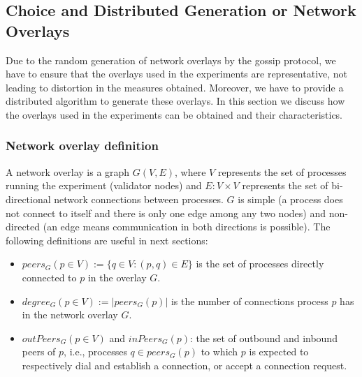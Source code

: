 














\subsection{Choice and Distributed Generation or Network Overlays}
\label{sec:topos}

Due to the random generation of network overlays by the gossip protocol, 
we have to ensure that the overlays used in the experiments are representative, not leading to distortion in the measures obtained.
Moreover, we have to provide a distributed algorithm to generate these overlays. In this section we discuss how the overlays used in the experiments can be obtained and their characteristics.

\subsubsection{Network overlay definition}

A network overlay is a graph $G(V,E)$, where $V$ represents the set of
processes running the experiment (validator nodes) and $E: V \times V$ represents the set of bi-directional network connections between processes.  $G$ is simple (a process does not connect to itself and there is only one edge among any two nodes) and non-directed
(an edge means communication in both directions is possible).  The following definitions are useful in next sections:
\begin{itemize}
	\item $peers_G(p \in V) := \{q \in V : (p, q) \in E\}$ is the set of processes directly
	connected to $p$ in the overlay $G$.
    \item $degree_G(p \in V) := |peers_G(p)|$ is the number of connections process $p$ has in
  the network overlay $G$.
   \item   $outPeers_G(p \in V)$ and $inPeers_G(p)$: the set of outbound and inbound peers of $p$, i.e., 
	processes $q \in peers_G(p)$ to which $p$ is expected to respectively dial
     and establish a connection, or accept a connection request.
\end{itemize}

